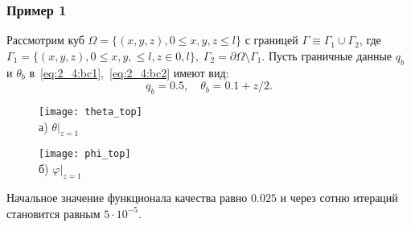 \begin{frame}
    \frametitle{Пример 1}
    Рассмотрим куб $\Omega = \{ (x, y, z), 0 \leq x,y,z \leq l \}$ с границей
    $\Gamma \equiv \Gamma_1 \cup \Gamma_2$, где
    $
    \Gamma_1 = \{(x, y, z), 0 \leq x,y, \leq l, z \in 0, l\}, \;
    \Gamma_2 = \partial \Omega \setminus \Gamma_1.
    $
    Пусть граничные данные $q_b$ и $\theta_b$ в~\eqref{eq:2_4:bc1},~\eqref{eq:2_4:bc2} имеют вид:
    \[ q_b = 0.5, \quad \theta_b = 0.1 + z/2. \]

    \begin{figure}[h!t]
        \begin{minipage}[b][][b]{0.49\linewidth}
            \centering
            \texttt{[image: theta\_top]}
            \\ а) $\theta|_{z=1}$
        \end{minipage}
        \hfill
        \begin{minipage}[b][][b]{0.49\linewidth}
            \centering
            \texttt{[image: phi\_top]}
            \\ б) $\varphi|_{z=1}$
        \end{minipage}
        \label{fig:4_4:5}
    \end{figure}


    Начальное значение функционала качества равно $0.025$ и
    через сотню итераций становится равным $5\cdot 10^{-5}$.
\end{frame}

